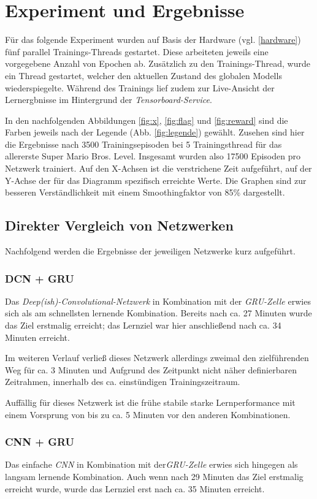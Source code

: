 \documentclass[sigconf,nonacm]{acmart}
\begin{document}
\section{Experiment und Ergebnisse}
Für das folgende Experiment wurden auf Basis der Hardware (vgl. \ref{hardware}) fünf parallel Trainings-Threads gestartet. Diese arbeiteten jeweils eine vorgegebene Anzahl von Epochen ab. Zusätzlich zu den Trainings-Thread, wurde ein Thread gestartet, welcher den aktuellen Zustand des globalen Modells wiederspiegelte. Während des Trainings lief zudem zur Live-Ansicht der Lernergbnisse im Hintergrund der \textit{Tensorboard-Service}.

In den nachfolgenden Abbildungen \ref{fig:x}, \ref{fig:flag} und \ref{fig:reward} sind die Farben jeweils nach der Legende (Abb. \ref{fig:legende}) gewählt. Zusehen sind hier die Ergebnisse nach 3500 Trainingsepisoden bei 5 Trainingsthread für das allererste Super Mario Bros. Level. Insgesamt wurden also 17500 Episoden pro Netzwerk trainiert. Auf den X-Achsen ist die verstrichene Zeit aufgeführt, auf der Y-Achse der für das Diagramm spezifisch erreichte Werte. Die Graphen sind zur besseren Verständlichkeit mit einem Smoothingfaktor von 85\% dargestellt.

\subsection{Direkter Vergleich von Netzwerken}
\label{exp1}
Nachfolgend werden die Ergebnisse der jeweiligen Netzwerke kurz aufgeführt.

\subsubsection{DCN + GRU}\hfill \break
Das \textit{Deep(ish)-Convolutional-Netzwerk} in Kombination mit der \textit{GRU-Zelle} erwies sich als am schnellsten lernende Kombination. Bereits nach ca. 27 Minuten wurde das Ziel erstmalig erreicht; das Lernziel war hier anschließend nach ca. 34 Minuten erreicht.

Im weiteren Verlauf verließ dieses Netzwerk allerdings zweimal den zielführenden Weg für ca. 3 Minuten und Aufgrund des Zeitpunkt nicht näher definierbaren Zeitrahmen, innerhalb des ca. einstündigen Trainingszeitraum.

Auffällig für dieses Netzwerk ist die frühe stabile starke Lernperformance mit einem Vorsprung von bis zu ca. 5 Minuten vor den anderen Kombinationen.

\subsubsection{CNN + GRU}\hfill \break
Das einfache \textit{CNN} in Kombination mit der\textit{GRU-Zelle} erwies sich hingegen als langsam lernende Kombination. Auch wenn nach 29 Minuten das Ziel erstmalig erreicht wurde, wurde das Lernziel erst nach ca. 35 Minuten erreicht.
\end{document}
